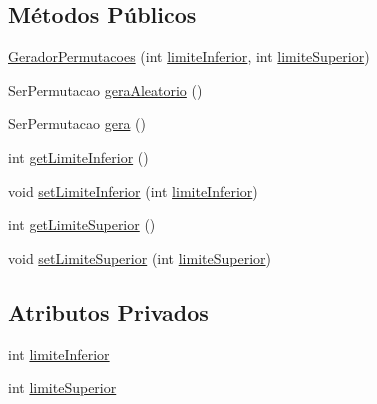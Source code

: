 \subsection*{Métodos Públicos}
\begin{DoxyCompactItemize}
\item 
\hyperlink{classic_1_1populacional_1_1seres_1_1permutacao_1_1_gerador_permutacoes_a19fcb679d05086294f10255356bb9d59}{Gerador\-Permutacoes} (int \hyperlink{classic_1_1populacional_1_1seres_1_1permutacao_1_1_gerador_permutacoes_a5073ecbd787b32fcb3f8f806c7d86dc5}{limite\-Inferior}, int \hyperlink{classic_1_1populacional_1_1seres_1_1permutacao_1_1_gerador_permutacoes_a0dc9a96a4ba3feaa6c33500d5e5f1825}{limite\-Superior})
\item 
Ser\-Permutacao \hyperlink{classic_1_1populacional_1_1seres_1_1permutacao_1_1_gerador_permutacoes_a254e528926ffe7b14dda3eb784961355}{gera\-Aleatorio} ()
\item 
Ser\-Permutacao \hyperlink{classic_1_1populacional_1_1seres_1_1permutacao_1_1_gerador_permutacoes_a7f7309cfdb7c2a317a177895725a04ef}{gera} ()
\item 
int \hyperlink{classic_1_1populacional_1_1seres_1_1permutacao_1_1_gerador_permutacoes_ad9d3d10359b4e5c1d0e57d10d47aa12d}{get\-Limite\-Inferior} ()
\item 
void \hyperlink{classic_1_1populacional_1_1seres_1_1permutacao_1_1_gerador_permutacoes_a7de330af505ca6ce5f11ad6de4f03a64}{set\-Limite\-Inferior} (int \hyperlink{classic_1_1populacional_1_1seres_1_1permutacao_1_1_gerador_permutacoes_a5073ecbd787b32fcb3f8f806c7d86dc5}{limite\-Inferior})
\item 
int \hyperlink{classic_1_1populacional_1_1seres_1_1permutacao_1_1_gerador_permutacoes_a49d52be103878682083f980a93db30d4}{get\-Limite\-Superior} ()
\item 
void \hyperlink{classic_1_1populacional_1_1seres_1_1permutacao_1_1_gerador_permutacoes_aeafeb1e3ab48c020c14caa6ec29c001a}{set\-Limite\-Superior} (int \hyperlink{classic_1_1populacional_1_1seres_1_1permutacao_1_1_gerador_permutacoes_a0dc9a96a4ba3feaa6c33500d5e5f1825}{limite\-Superior})
\end{DoxyCompactItemize}
\subsection*{Atributos Privados}
\begin{DoxyCompactItemize}
\item 
int \hyperlink{classic_1_1populacional_1_1seres_1_1permutacao_1_1_gerador_permutacoes_a5073ecbd787b32fcb3f8f806c7d86dc5}{limite\-Inferior}
\item 
int \hyperlink{classic_1_1populacional_1_1seres_1_1permutacao_1_1_gerador_permutacoes_a0dc9a96a4ba3feaa6c33500d5e5f1825}{limite\-Superior}
\end{DoxyCompactItemize}


